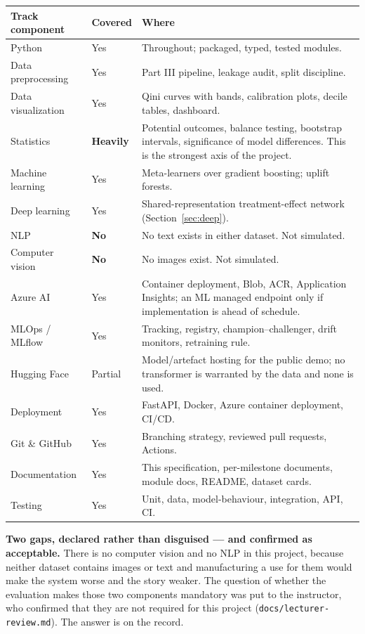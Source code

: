 \documentclass[11pt,a4paper]{article}
\begin{document}
\begin{tabularx}{\textwidth}{@{}L{4.2cm}L{2.0cm}X@{}}
\toprule
\textbf{Track component} & \textbf{Covered} & \textbf{Where} \\
\midrule
Python & Yes & Throughout; packaged, typed, tested modules. \\
Data preprocessing & Yes & Part III pipeline, leakage audit, split discipline. \\
Data visualization & Yes & Qini curves with bands, calibration plots, decile tables, dashboard. \\
Statistics & \textbf{Heavily} & Potential outcomes, balance testing, bootstrap intervals,
significance of model differences. This is the strongest axis of the project. \\
Machine learning & Yes & Meta-learners over gradient boosting; uplift forests. \\
Deep learning & Yes & Shared-representation treatment-effect network (Section~\ref{sec:deep}). \\
NLP & \textbf{No} & No text exists in either dataset. Not simulated. \\
Computer vision & \textbf{No} & No images exist. Not simulated. \\
Azure AI & Yes & Container deployment, Blob, ACR, Application Insights; an ML managed endpoint
only if implementation is ahead of schedule. \\
MLOps / MLflow & Yes & Tracking, registry, champion--challenger, drift monitors, retraining rule. \\
Hugging Face & Partial & Model/artefact hosting for the public demo; no transformer is warranted
by the data and none is used. \\
Deployment & Yes & FastAPI, Docker, Azure container deployment, CI/CD. \\
Git \& GitHub & Yes & Branching strategy, reviewed pull requests, Actions. \\
Documentation & Yes & This specification, per-milestone documents, module docs, README, dataset cards. \\
Testing & Yes & Unit, data, model-behaviour, integration, API, CI. \\
\bottomrule
\end{tabularx}

\begin{goodbox}
\textbf{Two gaps, declared rather than disguised --- and confirmed as acceptable.} There is no
computer vision and no NLP in this project, because neither dataset contains images or text and
manufacturing a use for them would make the system worse and the story weaker. The question of
whether the evaluation makes those two components mandatory was put to the instructor, who
confirmed that they are not required for this project (\texttt{docs/lecturer-review.md}). The
answer is on the record.
\end{goodbox}
\end{document}
